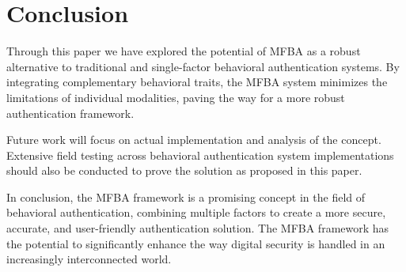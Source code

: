 \section{Conclusion}
Through this paper we have explored the potential of MFBA as a robust alternative to traditional and single-factor behavioral authentication systems. By integrating complementary behavioral traits, the MFBA system minimizes the limitations of individual modalities, paving the way for a more robust authentication framework.

Future work will focus on actual implementation and analysis of the concept. Extensive field testing across behavioral authentication system implementations should also be conducted to prove the solution as proposed in this paper.

In conclusion, the MFBA framework is a promising concept in the field of behavioral authentication, combining multiple factors to create a more secure, accurate, and user-friendly authentication solution. The MFBA framework has the potential to significantly enhance the way digital security is handled in an increasingly interconnected world.